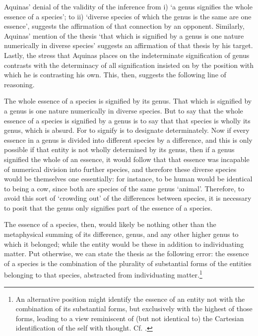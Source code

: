 \documentclass[]{article}
\begin{document}
Aquinas' denial of the validity of the inference from i) `a genus signifies the whole essence of a species'; to ii) `diverse species of which the genus is the same are one essence', suggests the affirmation of that connection by an opponent. Similarly, Aquinas' mention of the thesis `that which is signified by a genus is one nature numerically in diverse species' suggests an affirmation of that thesis by his target. Lastly, the stress that Aquinas places on the indeterminate signification of genus contrasts with the determinacy of all signification insisted on by the position with which he is contrasting his own. This, then, suggests the following line of reasoning.

The whole essence of a species is signified by its genus. That which is signified by a genus is one nature numerically in diverse species. But to say that the whole essence of a species is signified by a genus is to say that that species is wholly its genus, which is absurd. For to signify is to designate determinately. Now if every essence in a genus is divided into different species by a difference, and this is only possible if that entity is not wholly determined by its genus, then if a genus signified the whole of an essence, it would follow that that essence was incapable of numerical division into further species, and therefore these diverse species would be themselves one essentially: for instance, to be human would be identical to being a cow, since both are species of the same genus `animal'. Therefore, to avoid this sort of `crowding out' of the differences between species, it is necessary to posit that the genus only signifies part of the essence of a species.

The essence of a species, then, would likely be nothing other than the metaphysical summing of its difference, genus, and any other higher genus to which it belonged; while the entity would be these in addition to individuating matter. Put otherwise, we can state the thesis as the following error: the essence of a species is the combination of the plurality of substantial forms of the entities belonging to that species, abstracted from individuating matter.\footnote{An alternative position might identify the essence of an entity not with the combination of its substantial forms, but exclusively with the highest of those forms, leading to a view reminiscent of (but not identical to) the Cartesian identification of the self with thought. Cf. \autocite{Lagerlund2004}.}
\end{document}
